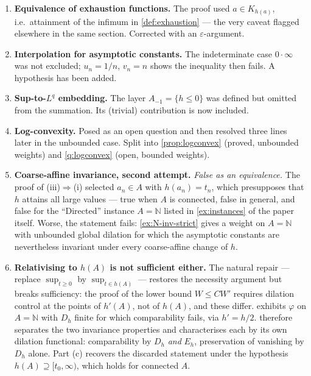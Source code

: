 \documentclass[11pt,a4paper]{article}
\numberwithin{equation}{section}
\theoremstyle{plain}
\theoremstyle{definition}
\theoremstyle{remark}
\newcommand{\N}{\mathbb{N}}
\begin{document}
\begin{enumerate}
\item \textbf{Equivalence of exhaustion functions.} The proof used
$a\in K_{h(a)}$, i.e.\ attainment of the infimum in \cref{def:exhaustion} --- the very
caveat flagged elsewhere in the same section. Corrected with an $\varepsilon$-argument.

\item \textbf{Interpolation for asymptotic constants.} The
indeterminate case $0\cdot\infty$ was not excluded; $u_n=1/n$, $v_n=n$ shows the
inequality then fails. A hypothesis has been added.

\item \textbf{Sup-to-$L^q$ embedding.} The layer $A_{-1}=\{h\le0\}$ was
defined but omitted from the summation. Its (trivial) contribution is now included.

\item \textbf{Log-convexity.} Posed as an open question and
then resolved three lines later in the unbounded case. Split into
\cref{prop:logconvex} (proved, unbounded weights) and \cref{q:logconvex} (open, bounded
weights).

\item \textbf{Coarse-affine invariance, second attempt.} \emph{False as an equivalence.} The proof of (iii)$\Rightarrow$(i) selected $a_n\in A$ with
$h(a_n)=t_n$, which presupposes that $h$ attains all large values --- true when $A$ is
connected, false in general, and false for the ``Directed'' instance $A=\N$ listed in
\cref{ex:instances} of the paper itself. Worse, the statement fails:
\cref{ex:N-inv-strict} gives a weight on $A=\N$ with unbounded global dilation for which
the asymptotic constants are nevertheless invariant under every coarse-affine change of
$h$.

\item \textbf{Relativising to $h(A)$ is not sufficient either.} The natural repair ---
replace $\sup_{t\ge0}$ by $\sup_{t\in h(A)}$ --- restores the necessity argument but breaks
sufficiency: the proof of the lower bound $W\le CW'$ requires dilation control at the
points of $h'(A)$, not of $h(A)$, and these differ.  exhibits
$\varphi$ on $A=\N$ with $D_h$ finite for which comparability fails, via $h'=h/2$.
 therefore separates the two invariance properties and
characterises each by its own dilation functional: comparability by $D_h$ \emph{and}
$E_h$, preservation of vanishing by $D_h$ alone. Part (c) recovers the discarded statement
under the hypothesis $h(A)\supseteq[t_0,\infty)$, which holds for connected $A$.


\end{enumerate}
\end{document}
